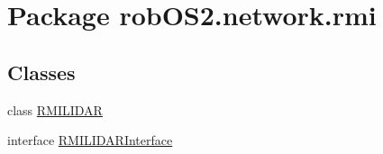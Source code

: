 \hypertarget{namespacerob_o_s2_1_1network_1_1rmi}{
\section{Package robOS2.network.rmi}
\label{namespacerob_o_s2_1_1network_1_1rmi}
}
\subsection*{Classes}
\begin{DoxyCompactItemize}
\item 
class \hyperlink{classrob_o_s2_1_1network_1_1rmi_1_1_r_m_i_l_i_d_a_r}{RMILIDAR}
\item 
interface \hyperlink{interfacerob_o_s2_1_1network_1_1rmi_1_1_r_m_i_l_i_d_a_r_interface}{RMILIDARInterface}
\end{DoxyCompactItemize}
